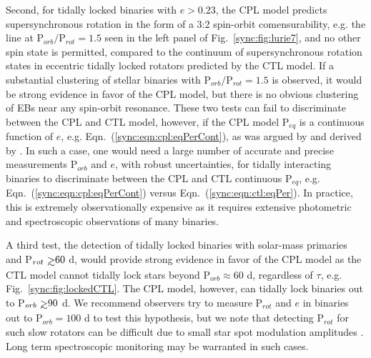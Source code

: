 Second, for tidally locked binaries with $e > 0.23$, the CPL model predicts supersynchronous rotation in the form of a 3:2 spin-orbit comensurability, e.g. the line at P$_{orb}/$P$_{rot} = 1.5$ seen in the left panel of Fig.~\ref{sync:fig:lurie7}, and no other spin state is permitted, compared to the continuum of supersynchronous rotation states in eccentric tidally locked rotators predicted by the CTL model. If a substantial clustering of stellar binaries with P$_{orb}/$P$_{rot} = 1.5$ is observed, it would be strong evidence in favor of the CPL model, but there is no obvious clustering of \kepler EBs near any spin-orbit resonance. These two tests can fail to discriminate between the CPL and CTL model, however, if the CPL model P$_{eq}$ is a continuous function of $e$, e.g. Eqn.~(\ref{sync:eqn:cpl:eqPerCont}), as was argued by \citet{Goldreich1966b} and derived by \citet{Murray1999}.  In such a case, one would need a large number of accurate and precise measurements P$_{orb}$ and $e$, with robust uncertainties, for tidally interacting binaries to discriminate between the CPL and CTL continuous P$_{eq}$, e.g. Eqn.~(\ref{sync:eqn:cpl:eqPerCont}) versus Eqn.~(\ref{sync:eqn:ctl:eqPer}).  In practice, this is extremely observationally expensive as it requires extensive photometric and spectroscopic observations of many binaries. 

 A third test, the detection of tidally locked binaries with solar-mass primaries and P$_{rot} \gsim 60$ d, would provide strong evidence in favor of the CPL model as the CTL model cannot tidally lock stars beyond P$_{orb} \approx 60$ d, regardless of $\tau$, e.g. Fig.~\ref{sync:fig:lockedCTL}. The CPL model, however, can tidally lock binaries out to P$_{orb} \gsim 90$ d.  We recommend observers try to measure P$_{rot}$ and $e$ in binaries out to P$_{orb} = 100 $ d to test this hypothesis, but we note that detecting P$_{rot}$ for such slow rotators can be difficult due to small star spot modulation amplitudes \citep{McQuillan2014,Lurie2017,Reinhold2018}. Long term spectroscopic monitoring may be warranted in such cases.

